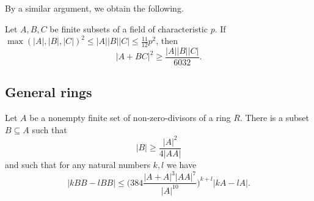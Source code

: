 By a similar argument, we obtain the following.

\begin{thm} Let $A,B,C$ be finite subsets of a field of characteristic $p$. If $\max(|A|,|B|,|C|)^2 \le |A||B||C| \le \frac{11}{12}p^2$, then
\[
|A+BC|^2 \ge \frac{|A||B||C|}{6032}.
\]
\end{thm}

\subsection{General rings}

\begin{thm} Let $A$ be a nonempty finite set of non-zero-divisors of a ring $R$. There is a subset $B \subseteq A$ such that
\[
|B| \ge \frac{|A|^2}{4|AA|}
\]
and such that for any natural numbers $k,l$ we have
\[
|kBB-lBB| \le \bigg(384\frac{|A+A|^3|AA|^7}{|A|^{10}}\bigg)^{k+l}|kA-lA|.
\]
\end{thm}
